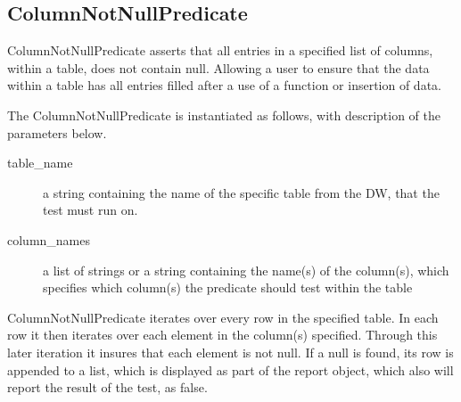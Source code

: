 \subsection{ColumnNotNullPredicate}
ColumnNotNullPredicate asserts that all entries in a specified list of columns, within a table, does not contain null. Allowing a user to ensure that the data within a table has all entries filled after a use of a function or insertion of data.

The ColumnNotNullPredicate is instantiated as follows, with description of the parameters below.


\begin{description}
\item [table\_name] a string containing the name of the specific table from the DW, that the test must run on. 
\item [column\_names] a list of strings or a string containing the name(s) of the column(s), which specifies which column(s) the predicate should test within the table
\end{description}

ColumnNotNullPredicate iterates over every row in the specified table. In each row it then iterates over each element in the column(s) specified. Through this later iteration it insures that each element is not null. If a null is found, its row is appended to a list, which is displayed as part of the report object, which also will report the result of the test, as false.

